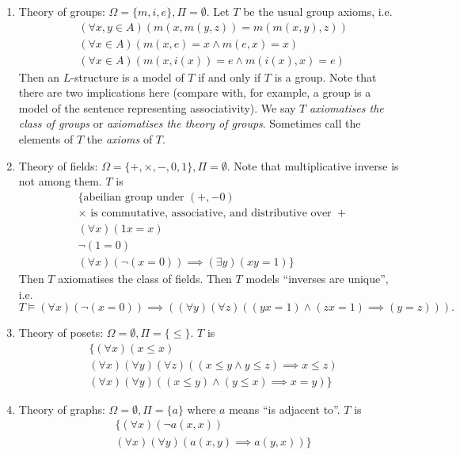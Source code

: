 \documentclass[a4paper]{article}
\begin{document}
\begin{eg}\leavevmode
  \begin{enumerate}
  \item Theory of groups: \(\Omega = \{m, i, e\}, \Pi = \emptyset\). Let \(T\) be the usual group axioms, i.e.
    \begin{align*}
      & (\forall x, y \in A) (m(x, m(y, z)) = m(m(x, y), z)) \\
      & (\forall x \in A) (m(x, e) = x \land m(e, x) = x) \\
      & (\forall x \in A) (m(x, i(x)) = e \land m(i(x), x) = e)
    \end{align*}
    Then an \(L\)-structure is a model of \(T\) if and only if \(T\) is a group. Note that there are two implications here (compare with, for example, a group is a model of the sentence representing associativity). We say \(T\) \emph{axiomatises the class of groups} or \emph{axiomatises the theory of groups}. Sometimes call the elements of \(T\) the \emph{axioms} of \(T\).
  \item Theory of fields: \(\Omega = \{+, \times, -, 0, 1\}, \Pi = \emptyset\). Note that multiplicative inverse is not among them. \(T\) is
    \begin{align*}
      & \{ \text{abeilian group under } (+, - 0) \\
      & \times \text{ is commutative, associative, and distributive over } + \\
      & (\forall x) (1x = x) \\
      & \neg (1 = 0) \\
      & (\forall x) (\neg(x = 0)) \implies (\exists y)(xy = 1) \}
    \end{align*}
    Then \(T\) axiomatises the class of fields. Then \(T\) models ``inverses are unique'', i.e.
    \[
      T \models (\forall x) (\neg (x = 0)) \implies ((\forall y) (\forall z) ((yx = 1) \land (zx = 1) \implies (y = z))).
    \]
  \item Theory of posets: \(\Omega = \emptyset, \Pi = \{\leq\}\). \(T\) is
    \begin{align*}
      & \{ (\forall x) (x \leq x) \\
      & (\forall x) (\forall y) (\forall z) ((x \leq y \land y \leq z) \implies x \leq z) \\
      & (\forall x) (\forall y) ((x \leq y) \land (y \leq x) \implies x = y) \}
    \end{align*}
  \item Theory of graphs: \(\Omega = \emptyset, \Pi = \{a\}\) where \(a\) means ``is adjacent to''. \(T\) is
    \begin{align*}
      & \{ (\forall x) (\neg a(x, x)) \\
      & (\forall x) (\forall y) (a(x, y) \implies a(y, x)) \}
    \end{align*}
  \end{enumerate}
\end{eg}
\end{document}
